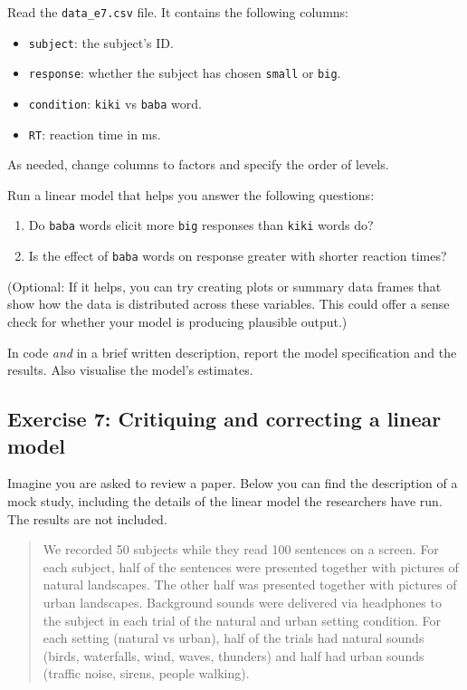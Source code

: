 \documentclass[
]{article}
\providecommand{\tightlist}{%
  \setlength{\itemsep}{0pt}\setlength{\parskip}{0pt}}
\begin{document}
Read the \texttt{data\_e7.csv} file. It contains the following columns:

\begin{itemize}
\tightlist
\item
  \texttt{subject}: the subject's ID.
\item
  \texttt{response}: whether the subject has chosen \texttt{small} or
  \texttt{big}.
\item
  \texttt{condition}: \texttt{kiki} vs \texttt{baba} word.
\item
  \texttt{RT}: reaction time in ms.
\end{itemize}

As needed, change columns to factors and specify the order of levels.

Run a linear model that helps you answer the following questions:

\begin{enumerate}
\def\labelenumi{\arabic{enumi}.}
\tightlist
\item
  Do \texttt{baba} words elicit more \texttt{big} responses than
  \texttt{kiki} words do?
\item
  Is the effect of \texttt{baba} words on response greater with shorter
  reaction times?
\end{enumerate}

(Optional: If it helps, you can try creating plots or summary data
frames that show how the data is distributed across these variables.
This could offer a sense check for whether your model is producing
plausible output.)

In code \emph{and} in a brief written description, report the model
specification and the results. Also visualise the model's estimates.

\newpage

\hypertarget{exercise-7-critiquing-and-correcting-a-linear-model}{%
\subsection{Exercise 7: Critiquing and correcting a linear
model}\label{exercise-7-critiquing-and-correcting-a-linear-model}}

Imagine you are asked to review a paper. Below you can find the
description of a mock study, including the details of the linear model
the researchers have run. The results are not included.

\begin{quote}
We recorded 50 subjects while they read 100 sentences on a screen. For
each subject, half of the sentences were presented together with
pictures of natural landscapes. The other half was presented together
with pictures of urban landscapes. Background sounds were delivered via
headphones to the subject in each trial of the natural and urban setting
condition. For each setting (natural vs urban), half of the trials had
natural sounds (birds, waterfalls, wind, waves, thunders) and half had
urban sounds (traffic noise, sirens, people walking).
\end{quote}
\end{document}
